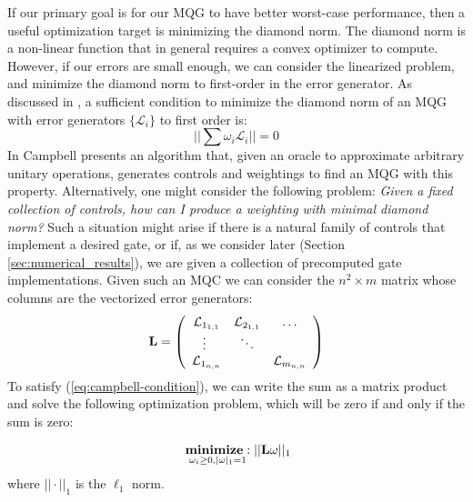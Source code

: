 \documentclass[aps,nofootinbib,pra,notitlepage,twocolumn]{revtex4-1}
\begin{document}
If our primary goal is for our MQG to have better worst-case performance, then a useful optimization target is minimizing the diamond norm. The diamond norm is a non-linear function that in general requires a convex optimizer to compute\cite{watrous2018theory}. However, if our errors are small enough, we can consider the linearized problem, and minimize the diamond norm to first-order in the error generator. As discussed in \cite{Campbell2017}, a sufficient condition to minimize the diamond norm of an MQG with error generators $\{\mathcal{L}_i\}$ to first order is:
\begin{equation}\label{eq:campbell-condition}
||\sum \omega_i \mathcal{L}_i ||= 0
\end{equation}
In \cite{Campbell2017} Campbell presents an algorithm that, given an oracle to approximate arbitrary unitary operations, generates controls and weightings to find an MQG with this property. Alternatively, one might consider the following problem: \textit{Given a fixed collection of controls, how can I produce a weighting with minimal diamond norm?} Such a situation might arise if there is a natural family of controls that implement a desired gate, or if, as we consider later (Section \ref{sec:numerical_results}), we are given a collection of precomputed gate implementations. Given such an MQC we can consider the $n^2\times m$ matrix whose columns are the vectorized error generators:
\begin{equation}\label{eq:vectorized_generators}
	\bold{L} = \left(\begin{array}{cccc}
		\mathcal{L}_{1_{1,1}} & \mathcal{L}_{2_{1,1}} & \ldots   \\ 
		\vdots\ & \ddots &    \\
		\mathcal{L}_{1_{n,n}} &  &  \mathcal{L}_{m_{n,n}} \\ 
	\end{array} 	
	\right)
\end{equation}
To satisfy (\ref{eq:campbell-condition}), we can write the sum as a matrix product and solve the following optimization problem, which will be zero if and only if the sum is zero:

\begin{equation}\label{eq:minimization}
  \begin{split}
    &\underset{\omega_i\geq0, |\omega|_1=1}{\textbf{minimize}: } ||\bold{L}\omega||_1\\
  \end{split}
\end{equation}
where $||\cdot||_1$ is the $\ell_1$ norm.
\end{document}
